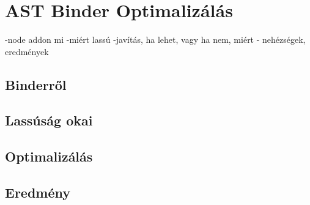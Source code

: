 \chapter*{AST Binder Optimalizálás}
-node addon mi
-miért lassú
-javítás, ha lehet, vagy ha nem, miért
- nehézségek, eredmények 

\section{Binderről}

\section{Lassúság okai}

\section{Optimalizálás}

\section{Eredmény}

